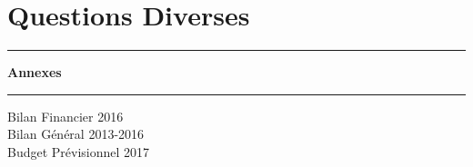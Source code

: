 \documentclass[11pt]{article}
\begin{document}
\section{Questions Diverses}

\newpage

\clearpage
\thispagestyle{empty}
\vspace*{\fill}
\begin{center}
\hrule
\vspace{.3cm}
\Huge\bfseries Annexes
\vspace{.3cm}
\hrule
\vspace{2cm}
\Large
\noindent Bilan Financier 2016\\
Bilan Général 2013-2016\\
Budget Prévisionnel 2017
\end{center}
\vspace*{\fill}




\end{document}
